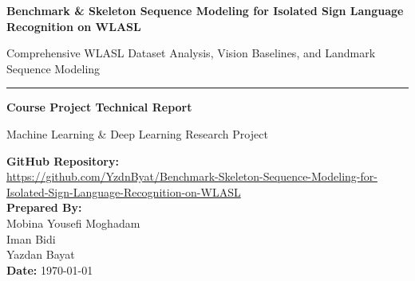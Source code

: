 \documentclass[12pt,a4paper]{article}
\begin{document}
\begin{titlepage}
    \centering
    \vspace*{1cm}
    
    {\Huge \bfseries \color{primaryblue} Benchmark \& Skeleton Sequence Modeling for Isolated Sign Language Recognition on WLASL \par}
    \vspace{0.6cm}
    {\Large \color{darkgray} Comprehensive WLASL Dataset Analysis, Vision Baselines, and Landmark Sequence Modeling \par}
    
    \vspace{1.2cm}
    \rule{\linewidth}{1.5pt}
    \vspace{1.2cm}
    
    {\Large \textbf{Course Project Technical Report}} \par
    \vspace{0.4cm}
    {\large Machine Learning \& Deep Learning Research Project} \par
    
    \vfill
    
    \begin{minipage}{0.85\textwidth}
        \centering
        \large
        \textbf{GitHub Repository:}\\[0.3em]
        \small\url{https://github.com/YzdnByat/Benchmark-Skeleton-Sequence-Modeling-for-Isolated-Sign-Language-Recognition-on-WLASL}\\[1.2em]
        
        \large
        \textbf{Prepared By:} \\[0.4cm]
        Mobina Yousefi Moghadam \\
        Iman Bidi \\
        Yazdan Bayat \\[0.8cm]
        
        \textbf{Date:} \today
    \end{minipage}

    \vfill
    \newpage
    
    \vspace*{2cm}
    
    \begin{abstract}
    \noindent Isolated Sign Language Recognition (ISLR) remains a pivotal computer vision task for bridging communication divides between deaf and hearing communities. This technical report provides an exhaustive empirical analysis of the World-Level American Sign Language (WLASL) dataset, detailing its metadata distribution, spatial dynamics, and video properties. We re-implement standard RGB frame-based 2D and 3D Convolutional Neural Network (CNN) baselines, validating performance against published literature benchmarks. To eliminate background noise and reduce memory requirements, we introduce a lightweight pipeline leveraging MediaPipe landmark extraction combined with PyTorch sequence models (Bi-LSTM / Transformers). The proposed framework achieves higher inference speed and enhanced classification accuracy over raw visual models.
    \end{abstract}
    

\end{titlepage}
\end{document}
